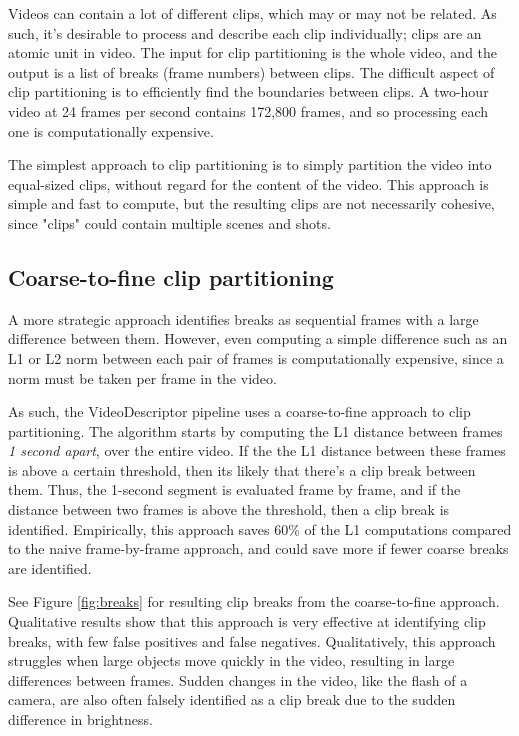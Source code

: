 Videos can contain a lot of different clips, which may or may not be related.
As such, it's desirable to process and describe each clip individually; clips are an atomic unit in video.
The input for clip partitioning is the whole video, and the output is a list of breaks (frame numbers) between clips.
The difficult aspect of clip partitioning is to efficiently find the boundaries between clips.
A two-hour video at 24 frames per second contains 172,800 frames, and so processing each one is computationally expensive.

The simplest approach to clip partitioning is to simply partition the video into equal-sized clips, without regard for the content of the video.
This approach is simple and fast to compute, but the resulting clips are not necessarily cohesive, since "clips" could contain multiple scenes and shots.

\subsection{Coarse-to-fine clip partitioning}
A more strategic approach identifies breaks as sequential frames with a large difference between them.
However, even computing a simple difference such as an L1 or L2 norm between each pair of frames is computationally expensive, since a norm must be taken per frame in the video.

As such, the VideoDescriptor pipeline uses a coarse-to-fine approach to clip partitioning.
The algorithm starts by computing the L1 distance between frames \textit{1 second apart}, over the entire video.
If the the L1 distance between these frames is above a certain threshold, then its likely that there's a clip break between them.
Thus, the 1-second segment is evaluated frame by frame, and if the distance between two frames is above the threshold, then a clip break is identified.
Empirically, this approach saves 60\% of the L1 computations compared to the naive frame-by-frame approach, and could save more if fewer coarse breaks are identified.

See Figure \ref{fig:breaks} for resulting clip breaks from the coarse-to-fine approach.
Qualitative results show that this approach is very effective at identifying clip breaks, with few false positives and false negatives.
Qualitatively, this approach struggles when large objects move quickly in the video, resulting in large differences between frames.
Sudden changes in the video, like the flash of a camera, are also often falsely identified as a clip break due to the sudden difference in brightness.

